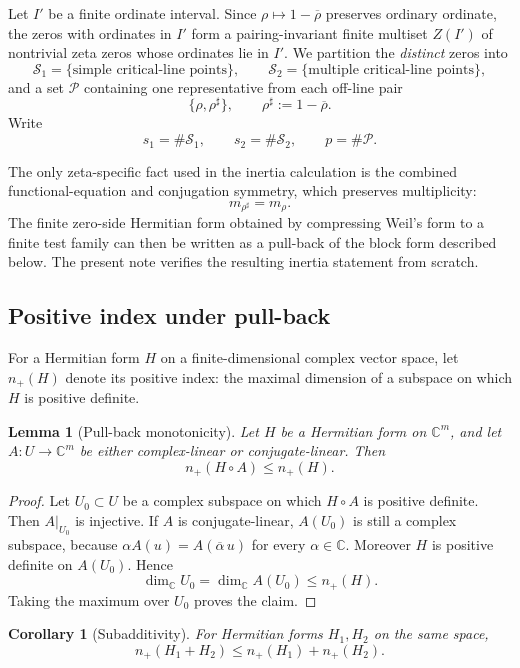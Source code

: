 \documentclass[11pt]{article}
\newtheorem{lemma}[theorem]{Lemma}
\newtheorem{corollary}[theorem]{Corollary}
\newcommand{\C}{\mathbb C}
\newcommand{\cS}{\mathcal S}
\newcommand{\cP}{\mathcal P}
\begin{document}
Let $I'$ be a finite ordinate interval. Since
$\rho\mapsto1-\overline\rho$ preserves ordinary ordinate, the zeros with
ordinates in $I'$ form a pairing-invariant finite multiset $Z(I')$ of
nontrivial zeta zeros whose ordinates lie in $I'$.  We partition the
\emph{distinct} zeros into
\[
 \cS_1=\{\text{simple critical-line points}\},\qquad
 \cS_2=\{\text{multiple critical-line points}\},
\]
and a set $\cP$ containing one representative from each off-line pair
\[
 \{\rho,\rho^\sharp\},
 \qquad
 \rho^\sharp:=1-\overline\rho .
\]
Write
\[
 s_1=\#\cS_1,\qquad s_2=\#\cS_2,\qquad p=\#\cP.
\]

The only zeta-specific fact used in the inertia calculation is the combined
functional-equation and conjugation symmetry, which preserves multiplicity:
\[
 m_{\rho^\sharp}=m_\rho.
\]
The finite zero-side Hermitian form obtained by compressing Weil's form to a
finite test family can then be written as a pull-back of the block form
described below.  The present note verifies the resulting inertia statement
from scratch.

\subsection{Positive index under pull-back}

For a Hermitian form $H$ on a finite-dimensional complex vector space, let
$n_+(H)$ denote its positive index: the maximal dimension of a subspace on
which $H$ is positive definite.

\begin{lemma}[Pull-back monotonicity]\label{ai:lem:pullback}
Let $H$ be a Hermitian form on $\C^m$, and let
$A:U\to\C^m$ be either complex-linear or conjugate-linear.  Then
\[
 n_+(H\circ A)\le n_+(H).
\]
\end{lemma}

\begin{proof}
Let $U_0\subset U$ be a complex subspace on which $H\circ A$ is positive
definite.  Then $A|_{U_0}$ is injective.  If $A$ is conjugate-linear,
$A(U_0)$ is still a complex subspace, because
$\alpha A(u)=A(\overline\alpha\,u)$ for every $\alpha\in\C$.
Moreover $H$ is positive definite on $A(U_0)$.  Hence
\[
 \dim_{\C}U_0=\dim_{\C}A(U_0)\le n_+(H).
\]
Taking the maximum over $U_0$ proves the claim.
\end{proof}

\begin{corollary}[Subadditivity]\label{ai:cor:subadd}
For Hermitian forms $H_1,H_2$ on the same space,
\[
 n_+(H_1+H_2)\le n_+(H_1)+n_+(H_2).
\]
\end{corollary}
\end{document}
